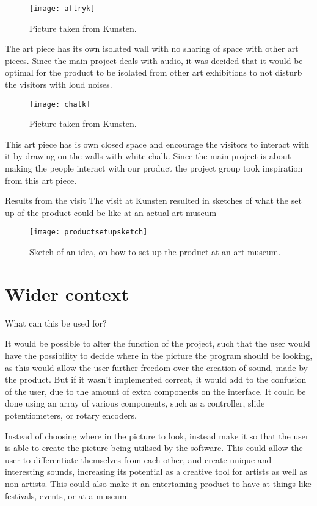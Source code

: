 \begin{figure}[!h] 
\centering
\texttt{[image: aftryk]}
\caption{\label{fig:aftryk} Picture taken from Kunsten.}
\end{figure}
The art piece has its own isolated wall with no sharing of space with other art pieces. Since the main project deals with audio, it was decided that it would be optimal for the product to be isolated from other art exhibitions to not disturb the visitors with loud noises.
 
 \begin{figure}[!h] 
\centering
\texttt{[image: chalk]}
\caption{\label{fig:chalk} Picture taken from Kunsten.}
\end{figure}
This art piece has is own closed space and encourage the visitors to interact with it by drawing on the walls with white chalk. Since the main project is about making the people interact with our product  the project group took inspiration from this art piece. 

Results from the visit
The visit at Kunsten resulted in sketches of what the set up of the product could be like at an actual art museum  
 
 \begin{figure}[!h] 
\centering
\texttt{[image: productsetupsketch]}
\caption{\label{fig:productsetupsketch} Sketch of an idea, on how to set up the product at an art museum.}
\end{figure}
 
 
\section{Wider context}
What can this be used for?

It would be possible to alter the function of the project, such that the user would have the possibility to decide where in the picture the program should be looking, as this would allow the user further freedom over the creation of sound, made by the product. But if it wasn't implemented correct, it would add to the confusion of the user, due to the amount of extra components on the interface. It could be done using an array of various components, such as a controller, slide potentiometers, or rotary encoders. 

Instead of choosing where in the picture to look, instead make it so that the user is able to create the picture being utilised by the software. This could allow the user to differentiate themselves from each other, and create unique and interesting sounds, increasing its potential as a creative tool for artists as well as non artists. This could also make it an entertaining product to have at things like festivals, events, or at a museum. 

